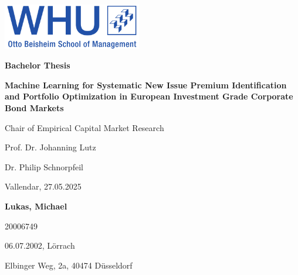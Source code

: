\begin{titlepage}
    \thispagestyle{empty}
    
    \hfill\includegraphics[height=2cm]{images/logo.pdf}
    
    \vspace{2cm}
    
    \begin{center}
        
        {\Huge \textbf{Bachelor Thesis}}\\
        \vspace{1.5cm}
        
        {\LARGE \textbf{Machine Learning for Systematic New Issue Premium Identification and Portfolio Optimization in European Investment Grade Corporate Bond Markets}}\\
        \vspace{2cm}
        
        {\large Chair of Empirical Capital Market Research}\\
        \vspace{0.5cm}
        
        {\large Prof. Dr. Johanning Lutz}\\
        \vspace{0.2cm}
        
        {\large Dr. Philip Schnorpfeil}\\
        \vspace{2cm}
        
        {\large Vallendar, 27.05.2025}\\
        \vspace{1.5cm}
        
        {\large \textbf{Lukas, Michael}}\\
        \vspace{0.5cm}
        
        {\large 20006749}\\
        \vspace{0.2cm}
        
        {\large 06.07.2002, Lörrach}\\
        \vspace{0.2cm}
        
        {\large Elbinger Weg, 2a, 40474 Düsseldorf}\\
        
    \end{center}
    
\end{titlepage}